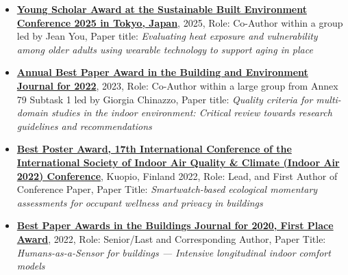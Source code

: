 \documentclass[10pt,a4paper]{article}
\begin{document}
\begin{small}
\begin{itemize}
  \item \textbf{\href{https://www.dropbox.com/scl/fi/gc79x3r9zwjy2nzny4xw0/YoungScholarAward-sbe2025tokyo.pdf?rlkey=wd0b3sxv51u5rhdr2jg8fawdd&dl=0}{Young Scholar Award at the Sustainable Built Environment Conference 2025 in Tokyo, Japan}}, 2025, Role: Co-Author within a group led by Jean You, Paper title: \emph{Evaluating heat exposure and vulnerability among older adults using wearable technology to support aging in place}%
  

  \item \textbf{\href{https://vbn.aau.dk/en/prizes/2022-building-and-environment-best-paper-award}{Annual Best Paper Award in the Building and Environment Journal for 2022}}, 2023, Role: Co-Author within a large group from Annex 79 Subtask 1 led by Giorgia Chinazzo, Paper title: \emph{Quality criteria for multi-domain studies in the indoor environment: Critical review towards research guidelines and recommendations}%

  \item \textbf{\href{https://www.dropbox.com/s/itgecftt1gc3syq/IndoorAirBestPosterAwardCertificateMiller.pdf?dl=0}{Best Poster Award, 17th International Conference of the International Society of Indoor Air Quality \& Climate (Indoor Air 2022) Conference}}, Kuopio, Finland 2022, Role: Lead, and First Author of Conference Paper, Paper Title: \emph{Smartwatch-based ecological momentary assessments for occupant wellness and privacy in buildings}%

  \item \textbf{\href{https://www.mdpi.com/journal/buildings/awards/1245}{Best Paper Awards in the Buildings Journal for 2020, First Place Award}}, 2022, Role: Senior/Last and Corresponding Author, Paper Title: \emph{Humans-as-a-Sensor for buildings — Intensive longitudinal indoor comfort models}%




\end{itemize}
\end{small}
\end{document}
